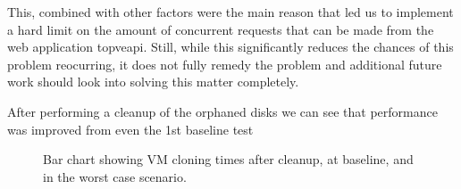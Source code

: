         This, combined with other factors were the main reason that led us to implement a hard limit on the amount of concurrent 
        requests that can be made from the web application to\ac{pve}\ac{api}. Still, while this significantly reduces the chances 
        of this problem reocurring, it does not fully remedy the problem and additional future work should look into solving this 
        matter completely.

        After performing a cleanup of the orphaned disks we can see that performance was improved from even the 1st baseline test

        \begin{figure}[h]
        \centering
        \caption{Bar chart showing VM cloning times after cleanup, at baseline, and in the worst case scenario.}
        \label{fig:vm_grouped_cloning_focus}
        \end{figure}





